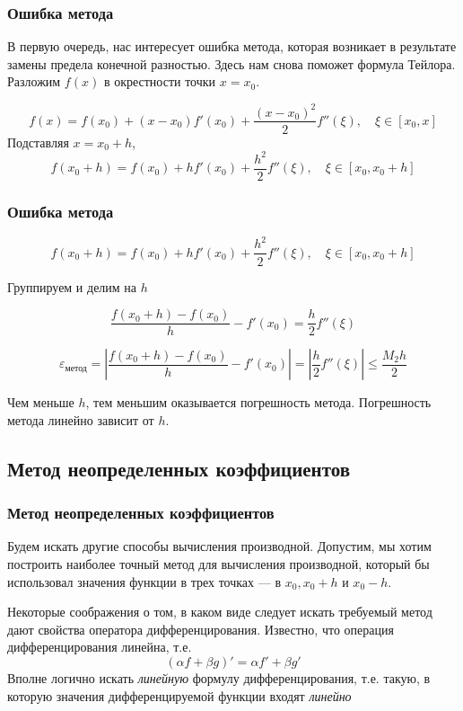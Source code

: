 \documentclass[aspectratio=43,unicode]{beamer}
\begin{document}
\begin{frame}
\frametitle{Ошибка метода}
	В первую очередь, нас интересует ошибка метода, которая возникает в результате замены предела
	конечной разностью. Здесь нам снова поможет формула Тейлора. Разложим $f(x)$ в окрестности
	точки $x = x_0$.

	\[
	f(x) = f(x_0) + (x-x_0) f'(x_0) + \frac{(x-x_0)^2}{2} f''(\xi), \quad \xi \in [x_0,x]
	\]
	\pause
	Подставляя $x = x_0 + h$,
	\[
	f(x_0 + h) = f(x_0) + h f'(x_0) + \frac{h^2}{2} f''(\xi), \quad \xi \in [x_0,x_0+h]
	\]
\end{frame}

\begin{frame}
\frametitle{Ошибка метода}
	\[
	f(x_0 + h) = f(x_0) + h f'(x_0) + \frac{h^2}{2} f''(\xi), \quad \xi \in [x_0,x_0+h]
	\]

	Группируем и делим на $h$

	\[
	\frac{f(x_0 + h) - f(x_0)}{h} - f'(x_0) = \frac{h}{2} f''(\xi)
	\]

	\[
	\varepsilon_{\text{метод}} = \left|\frac{f(x_0 + h) - f(x_0)}{h} - f'(x_0) \right| = \left |\frac{h}{2} f''(\xi) \right | \leqslant \frac{M_2 h}{2}
	\]

	Чем меньше $h$, тем меньшим оказывается погрешность метода. Погрешность метода линейно зависит от $h$.
\end{frame}

\subsection{Метод неопределенных коэффициентов}
\begin{frame}
\frametitle{Метод неопределенных коэффициентов}
	Будем искать другие способы вычисления производной. Допустим, мы хотим построить наиболее
	точный метод для вычисления производной, который бы использовал значения функции в трех точках ---
	в $x_0, x_0+h$ и $x_0-h$.

	Некоторые соображения о том, в каком виде следует искать требуемый метод дают свойства оператора дифференцирования.
	Известно, что операция дифференцирования линейна, т.е.
	\[
	(\alpha f + \beta g)' = \alpha f' + \beta g'
	\]
	Вполне логично искать \emph{линейную} формулу дифференцирования, т.е. такую, в которую значения дифференцируемой функции входят
	\emph{линейно}
\end{frame}
\end{document}

